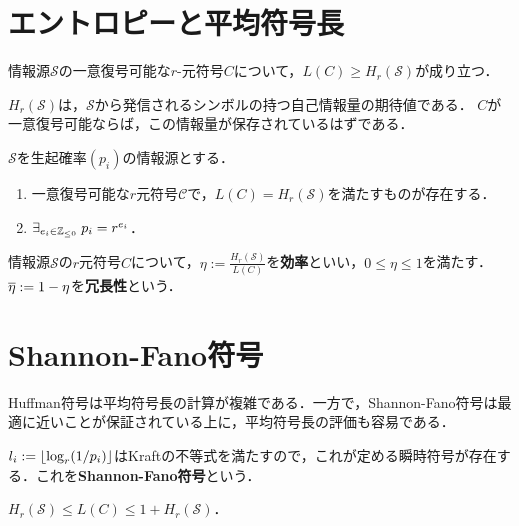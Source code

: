 \documentclass[uplatex,dvipdfmx]{jsreport}
\renewcommand{\S}{\mathcal{S}}
\renewcommand{\C}{\mathcal{C}}
\begin{document}
\section{エントロピーと平均符号長}

\begin{theorem}
    情報源$\S$の一意復号可能な$r$-元符号$C$について，$L(C)\ge H_r(\S)$が成り立つ．
\end{theorem}
\begin{remarks}
    $H_r(\S)$は，$\S$から発信されるシンボルの持つ自己情報量の期待値である．
    $C$が一意復号可能ならば，この情報量が保存されているはずである．
\end{remarks}

\begin{corollary}
    $\S$を生起確率$(p_i)$の情報源とする．
    \begin{enumerate}
        \item 一意復号可能な$r$元符号$\C$で，$L(C)=H_r(\S)$を満たすものが存在する．
        \item $\exists_{e_i\in\mathbb{Z}_{\le0}}\;p_i=r^{e_i}$．
    \end{enumerate}
\end{corollary}

\begin{definition}
    情報源$\S$の$r$元符号$C$について，$\eta:=\frac{H_r(\S)}{L(C)}$を\textbf{効率}といい，$0\le\eta\le1$を満たす．
    $\overline{\eta}:=1-\eta$を\textbf{冗長性}という．
\end{definition}

\section{Shannon-Fano符号}

\begin{tcolorbox}[colframe=ForestGreen, colback=ForestGreen!10!white,breakable,colbacktitle=ForestGreen!40!white,coltitle=black,fonttitle=\bfseries\sffamily,
title=]
    Huffman符号は平均符号長の計算が複雑である．一方で，Shannon-Fano符号は最適に近いことが保証されている上に，平均符号長の評価も容易である．
\end{tcolorbox}

\begin{definition}
    $l_i:=\lfloor\log_r(1/p_i)\rfloor$はKraftの不等式を満たすので，これが定める瞬時符号が存在する．これを\textbf{Shannon-Fano符号}という．
\end{definition}

\begin{proposition}
    $H_r(\S)\le L(C)\le 1+H_r(\S)$．
\end{proposition}
\end{document}
